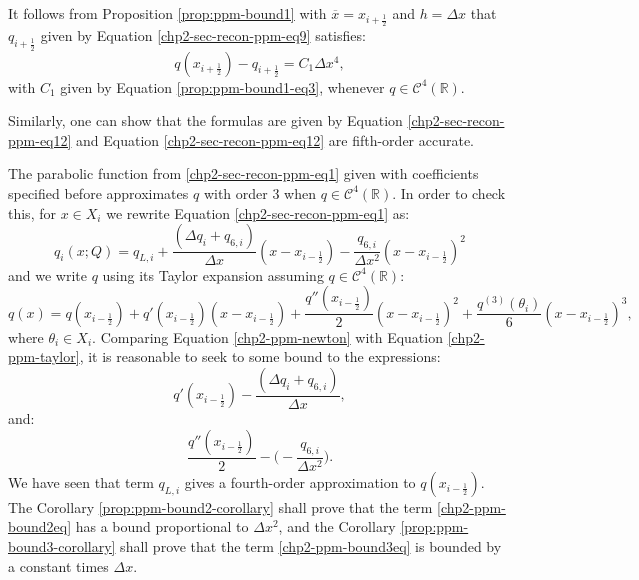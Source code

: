 \begin{corollary}
	\label{prop:ppm-bound1-corollary}
	It follows from Proposition \ref{prop:ppm-bound1} with
	$\overline{x} = x_{i+\frac{1}{2}}$ and $h = \Delta x$
	that $q_{i+\frac{1}{2}}$ given by Equation \eqref{chp2-sec-recon-ppm-eq9} satisfies:
	\begin{equation}
		\label{ppm-edges-bound1}
		q{(x_{i+\frac{1}{2}})} - q_{i+\frac{1}{2}} = C_1\Delta x^4,
	\end{equation}
	with $C_1$ given by Equation \eqref{prop:ppm-bound1-eq3}, whenever $q \in \mathcal{C}^4(\mathbb{R}).$
\end{corollary}
\begin{remark}
	Similarly, one can show that the formulas are given by Equation
	\eqref{chp2-sec-recon-ppm-eq12} and Equation \eqref{chp2-sec-recon-ppm-eq12}
	are fifth-order accurate.
\end{remark}
The parabolic function from \eqref{chp2-sec-recon-ppm-eq1}  given with 
coefficients specified before approximates $q$ with order 3 when 
$q \in \mathcal{C}^4(\mathbb{R})$.
In order to check this, for $x \in X_i$ we rewrite Equation 
\eqref{chp2-sec-recon-ppm-eq1} as: 
\begin{equation}
	\label{chp2-ppm-newton}
	q_i(x;Q) = q_{L,i} + \frac{(\Delta q_i + q_{6, i})}{\Delta x}(x-x_{i-\frac{1}{2}})
	-\frac{q_{6, i}}{\Delta x^2}(x-x_{i-\frac{1}{2}})^2
\end{equation}
and we write $q$ using its Taylor expansion assuming $q \in \mathcal{C}^4(\mathbb{R})$:
\begin{equation}
	\label{chp2-ppm-taylor}
	q(x) = q(x_{i-\frac{1}{2}}) + q'(x_{i-\frac{1}{2}})(x-x_{i-\frac{1}{2}})
	+ \frac{q''(x_{i-\frac{1}{2}})}{2}(x-x_{i-\frac{1}{2}})^2
	+ \frac{q^{(3)}(\theta_i)}{6}(x-x_{i-\frac{1}{2}})^3,
\end{equation}
where $\theta_i \in X_i$.
Comparing Equation \eqref{chp2-ppm-newton} with Equation \eqref{chp2-ppm-taylor},
it is reasonable to seek to some bound to the expressions:
\begin{equation}
	\label{chp2-ppm-bound2eq}
	q'(x_{i-\frac{1}{2}})-\frac{(\Delta q_i + q_{6, i})}{\Delta x},
\end{equation}
and:
\begin{equation} 
	\label{chp2-ppm-bound3eq}
	\frac{q''(x_{i-\frac{1}{2}})}{2} -\bigg(-\frac{q_{6, i}}{\Delta x^2}\bigg).
\end{equation}
We have seen that term $q_{L,i}$ gives a fourth-order approximation to $q(x_{i-\frac{1}{2}})$.
The Corollary \ref{prop:ppm-bound2-corollary} shall prove that 
the term \eqref{chp2-ppm-bound2eq} has a bound proportional to $\Delta x^2$, and
the Corollary \ref{prop:ppm-bound3-corollary} shall prove that the
term \eqref{chp2-ppm-bound3eq} is bounded by a constant times $\Delta x$.

